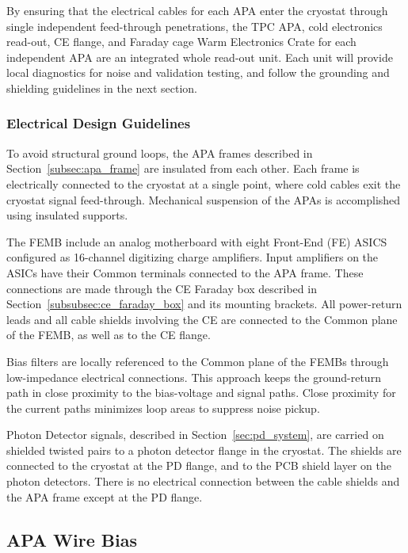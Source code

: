 By ensuring that the electrical cables for each APA enter the cryostat through single 
independent feed-through penetrations, the TPC APA, cold electronics read-out, CE flange, 
and Faraday cage Warm Electronics Crate for each independent APA are an integrated whole
read-out unit. Each unit will provide local diagnostics for noise and validation testing,
and follow the grounding and shielding guidelines in the next section.

\subsubsection{Electrical Design Guidelines}
\label{subsec:ele_design}

To avoid structural ground loops, the APA frames described in Section~\ref{subsec:apa_frame} 
are insulated from each other. Each frame is electrically connected to the cryostat at a single 
point, where cold cables exit the cryostat signal feed-through. Mechanical suspension of the APAs 
is accomplished using insulated supports. 

The FEMB include an analog motherboard with eight Front-End (FE) ASICS configured as 16-channel 
digitizing charge amplifiers. Input amplifiers on the ASICs have their Common terminals connected 
to the APA frame. These connections are made through the CE Faraday box described in 
Section~\ref{subsubsec:ce_faraday_box} and its mounting brackets. All power-return leads and all cable shields 
involving the CE are connected to the Common plane of the FEMB, as well as to the CE flange.

Bias filters are locally referenced to the Common plane of the FEMBs through low-impedance 
electrical connections. This approach keeps the ground-return path in close proximity to the 
bias-voltage and signal paths. Close proximity for the current paths minimizes loop areas to 
suppress noise pickup.

Photon Detector signals, described in Section~\ref{sec:pd_system}, are carried on shielded 
twisted pairs to a photon detector flange in the cryostat. The shields are connected to the 
cryostat at the PD flange, and to the PCB shield layer on the photon detectors. There is no 
electrical connection between the cable shields and the APA frame except at the PD flange.

%
\subsection{APA Wire Bias}
\label{subsec:ce_wire_bias}


